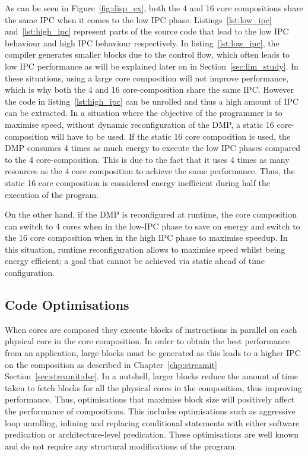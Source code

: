 As can be seen in Figure~\ref{fig:disp_ex}, both the 4 and 16 core compositions share the same IPC when it comes to the low IPC phase.
Listings~\ref{lst:low_ipc} and~\ref{lst:high_ipc} represent parts of the source code that lead to the low IPC behaviour and high IPC behaviour respectively.
In listing~\ref{lst:low_ipc}, the compiler generates smaller blocks due to the control flow, which often leads to low IPC performance as will be explained later on in Section~\ref{sec:lim_study}.
In these situations, using a large core composition will not improve performance, which is why both the 4 and 16 core-composition share the same IPC.
However the code in listing~\ref{lst:high_ipc} can be unrolled and thus a high amount of IPC can be extracted.
In a situation where the objective of the programmer is to maximise speed, without dynamic reconfiguration of the DMP, a static 16 core-composition will have to be used.
If the static 16 core composition is used, the DMP consumes 4 times as much energy to execute the low IPC phases compared to the 4 core-composition.
This is due to the fact that it uses 4 times as many resources as the 4 core composition to achieve the same performance.
Thus, the static 16 core composition is considered energy inefficient during half the execution of the program.

On the other hand, if the DMP is reconfigured at runtime, the core composition can switch to 4 cores when in the low-IPC phase to save on energy and switch to the 16 core composition when in the high IPC phase to maximise speedup.
In this situation, runtime reconfiguration allows to maximise speed whilst being energy efficient; a goal that cannot be achieved via static ahead of time configuration.

\subsection{Code Optimisations}

When cores are composed they execute blocks of instructions in parallel on each physical core in the core composition.
In order to obtain the best performance from an application, large blocks must be generated as this leads to a higher IPC on the composition as described in Chapter~\ref{chp:streamit} Section~\ref{sec:streamit:dse}.
In a nutshell, larger blocks reduce the amount of time taken to fetch blocks for all the physical cores in the composition, thus improving performance.
Thus, optimisations that maximise block size will positively affect the performance of compositions.
This includes optimisations such as aggressive loop unrolling, inlining and replacing conditional statements with either software predication or architecture-level predication.
These optimisations are well known and do not require any structural modifications of the program.


